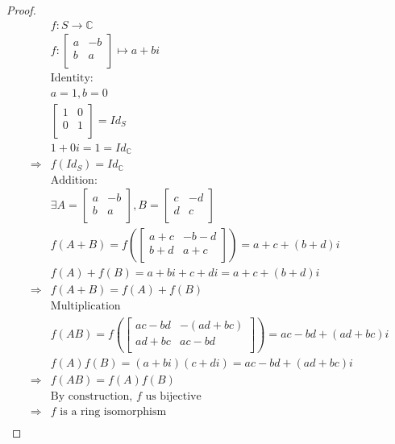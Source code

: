 \documentclass{article}
\begin{document}
\begin{proof}
    \begin{align*}
        &f:S\rightarrow \mathbb{C} \\
        &f:\begin{bmatrix}
            a&-b\\
            b&a\\
        \end{bmatrix}\mapsto a+bi\\
        &\text{Identity}:\\
        &a=1,b=0\\
        &\begin{bmatrix}
            1&0\\
            0&1\\
        \end{bmatrix}=Id_S\\
        &1+0i=1=Id_\mathbb{C} \\
        \Rightarrow&f(Id_S)=Id_\mathbb{C} \\
        &\text{Addition}:\\
        &\exists A=\begin{bmatrix}
            a&-b\\
            b&a\\
        \end{bmatrix},B=\begin{bmatrix}
            c&-d\\
            d&c\\
        \end{bmatrix}\\
        &f(A+B)=f(\begin{bmatrix}
            a+c&-b-d\\
            b+d&a+c\\
        \end{bmatrix})=a+c+(b+d)i\\
        &f(A)+f(B)=a+bi+c+di=a+c+(b+d)i\\
        \Rightarrow&f(A+B)=f(A)+f(B)\\
        &\text{Multiplication}\\
        &f(AB)=f(\begin{bmatrix}
            ac-bd&-(ad+bc)\\
            ad+bc&ac-bd\\
        \end{bmatrix})=ac-bd+(ad+bc)i\\
        &f(A)f(B)=(a+bi)(c+di)=ac-bd+(ad+bc)i\\
        \Rightarrow&f(AB)=f(A)f(B)\\
        &\text{By construction, }f\text{ us bijective}\\
        \Rightarrow&f\text{ is a ring isomorphism}\\
    \end{align*}
\end{proof}
\end{document}
